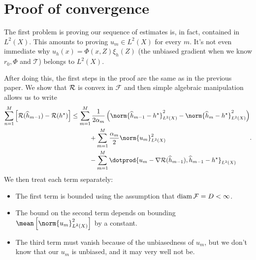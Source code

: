 \section{Proof of convergence}

The first problem is proving our sequence of estimates is, in fact, contained in $ L^{ 2 } ( X ) $.
This amounts to proving $ u_{ m } \in L^{ 2 } ( X ) $ for every $ m $.
It's not even immediate why $ u_{ h } ( x ) = \Phi ( x, Z ) \xi_{ h } ( Z ) $ (the unbiased gradient when we know $ r_{ 0 }, \Phi $ and $ \mathcal{T} $) belongs to $ L^{ 2 } ( X ) $.

After doing this, the first steps in the proof are the same as in the previous paper.
We show that $ \mathcal{R} $ is convex in $ \mathcal{F} $ and then simple algebraic manipulation allows us to write
\begin{align*}
    \begin{split}
        \sum_{ n=1 }^{ M } \left[
            \risk ( \hat{ h }_{ m-1 } ) - \risk ( \hstar )
        \right]
        &\leq \sum_{ m=1 }^{ M } \frac{ 1 }{ 2 \alpha_{ m } } \left(
            \norm{ \hat{ h }_{ m-1 } - \hstar }^2_{ L^{ 2 } ( X ) }
            -
            \norm{ \hat{ h }_{ m } - \hstar }^2_{ L^{ 2 } ( X ) }
        \right) \\
        &\hspace{1cm} + \sum_{ m=1 }^{ M } \frac{ \alpha_{ m } }{ 2 } \norm{ u_{ m } }^2_{ L^{ 2 } ( X ) } \\
        &\hspace{1cm} - \sum_{ m=1 }^{ M }
        \dotprod{ u_{ m } - \nabla \risk ( \hat{ h }_{ m-1 } ), \hat{ h }_{ m-1 } - \hstar }_{ L^{ 2 } ( X ) }
    \end{split}
.\end{align*}
We then treat each term separately:
\begin{itemize}
    \item The first term is bounded using the assumption that $ \operatorname{diam} \mathcal{F} = D < \infty $.
    \item The bound on the second term depends on bounding $ \mean \left[ \norm{ u_{ m } }^2_{ L^{ 2 } ( X ) } \right] $ by a constant.
    \item The third term must vanish because of the unbiasedness of $ u_{ m } $, but we don't know that our $ u_{ m } $ is unbiased, and it may very well not be.
\end{itemize}

